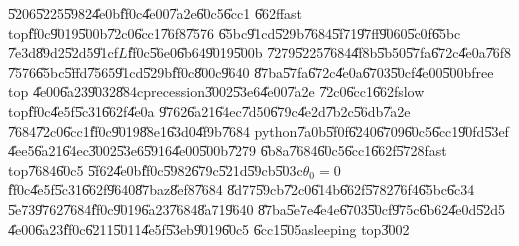 \documentclass[12pt]{article}
\begin{document}
\U{5206}\U{5225}\U{5982}\U{4e0b}\U{ff0c}\U{4e00}\U{7a2e}\U{60c5}\U{6cc1}%
\U{662f}fast top\U{ff0c}\U{9019}\U{500b}\U{72c0}\U{6cc1}\U{76f8}\U{7576}%
\U{65bc}\U{91cd}\U{529b}\U{7684}\U{5f71}\U{97ff}\U{9060}\U{5c0f}\U{65bc}%
\U{7e3d}\U{89d2}\U{52d5}\U{91cf}$L$\U{ff0c}\U{56e0}\U{6b64}\U{9019}\U{500b}%
\U{7279}\U{5225}\U{7684}\U{4f8b}\U{5b50}\U{57fa}\U{672c}\U{4e0a}\U{76f8}%
\U{7576}\U{65bc}\U{5ffd}\U{7565}\U{91cd}\U{529b}\U{ff0c}\U{800c}\U{9640}%
\U{87ba}\U{57fa}\U{672c}\U{4e0a}\U{6703}\U{50cf}\U{4e00}\U{500b}free top%
\U{4e00}\U{6a23}\U{9032}\U{884c}precession\U{3002}\U{53e6}\U{4e00}\U{7a2e}%
\U{72c0}\U{6cc1}\U{662f}slow top\U{ff0c}\U{4e5f}\U{5c31}\U{662f}\U{4e0a}%
\U{9762}\U{6a21}\U{64ec}\U{7d50}\U{679c}\U{4e2d}\U{7b2c}\U{56db}\U{7a2e}%
\U{7684}\U{72c0}\U{6cc1}\U{ff0c}\U{9019}\U{88e1}\U{63d0}\U{4f9b}\U{7684}%
python\U{7a0b}\U{5f0f}\U{6240}\U{6709}\U{60c5}\U{6cc1}\U{90fd}\U{53ef}%
\U{4ee5}\U{6a21}\U{64ec}\U{3002}\U{53e6}\U{5916}\U{4e00}\U{500b}\U{7279}%
\U{6b8a}\U{7684}\U{60c5}\U{6cc1}\U{662f}\U{5728}fast top\U{7684}\U{60c5}%
\U{5f62}\U{4e0b}\U{ff0c}\U{5982}\U{679c}\U{521d}\U{59cb}\U{503c}$\theta
_{0}=0$\U{ff0c}\U{4e5f}\U{5c31}\U{662f}\U{9640}\U{87ba}z\U{8ef8}\U{7684}%
\U{8d77}\U{59cb}\U{72c0}\U{614b}\U{662f}\U{5782}\U{76f4}\U{65bc}\U{6c34}%
\U{5e73}\U{9762}\U{7684}\U{ff0c}\U{9019}\U{6a23}\U{7684}\U{8a71}\U{9640}%
\U{87ba}\U{5e7e}\U{4e4e}\U{6703}\U{50cf}\U{975c}\U{6b62}\U{4e0d}\U{52d5}%
\U{4e00}\U{6a23}\U{ff0c}\U{6211}\U{5011}\U{4e5f}\U{53eb}\U{9019}\U{60c5}%
\U{6cc1}\U{505a}sleeping top\U{3002}
\end{document}
